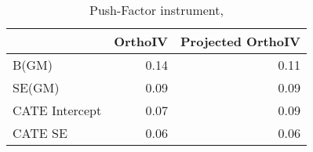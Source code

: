 \begin{table}\centering\caption{Push-Factor instrument, }\begin{tabular}{lrr}
\toprule
                &   OrthoIV &   Projected OrthoIV \\
\midrule
 B(GM)          &      0.14 &                0.11 \\
 SE(GM)         &      0.09 &                0.09 \\
 CATE Intercept &      0.07 &                0.09 \\
 CATE SE        &      0.06 &                0.06 \\
\bottomrule
\end{tabular}\end{table}